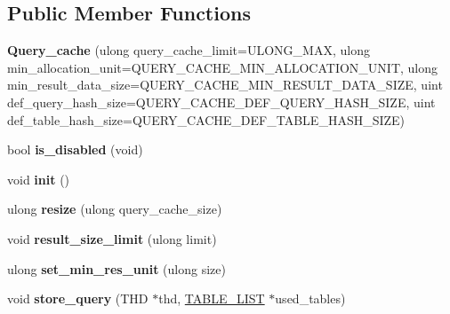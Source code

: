 \subsection*{Public Member Functions}
\begin{DoxyCompactItemize}
\item 
\mbox{\label{classQuery__cache_a5303b56588dbeffb235d08e13f2bbb4f}} 
{\bfseries Query\+\_\+cache} (ulong query\+\_\+cache\+\_\+limit=U\+L\+O\+N\+G\+\_\+\+M\+AX, ulong min\+\_\+allocation\+\_\+unit=Q\+U\+E\+R\+Y\+\_\+\+C\+A\+C\+H\+E\+\_\+\+M\+I\+N\+\_\+\+A\+L\+L\+O\+C\+A\+T\+I\+O\+N\+\_\+\+U\+N\+IT, ulong min\+\_\+result\+\_\+data\+\_\+size=Q\+U\+E\+R\+Y\+\_\+\+C\+A\+C\+H\+E\+\_\+\+M\+I\+N\+\_\+\+R\+E\+S\+U\+L\+T\+\_\+\+D\+A\+T\+A\+\_\+\+S\+I\+ZE, uint def\+\_\+query\+\_\+hash\+\_\+size=Q\+U\+E\+R\+Y\+\_\+\+C\+A\+C\+H\+E\+\_\+\+D\+E\+F\+\_\+\+Q\+U\+E\+R\+Y\+\_\+\+H\+A\+S\+H\+\_\+\+S\+I\+ZE, uint def\+\_\+table\+\_\+hash\+\_\+size=Q\+U\+E\+R\+Y\+\_\+\+C\+A\+C\+H\+E\+\_\+\+D\+E\+F\+\_\+\+T\+A\+B\+L\+E\+\_\+\+H\+A\+S\+H\+\_\+\+S\+I\+ZE)
\item 
\mbox{\label{classQuery__cache_a5367fca59aea9c2bc05dddc2548bec73}} 
bool {\bfseries is\+\_\+disabled} (void)
\item 
\mbox{\label{classQuery__cache_a9c175f78ac3992282c8b7951a909bd52}} 
void {\bfseries init} ()
\item 
\mbox{\label{classQuery__cache_a5f7784c30f875bdbeacd6d6e98c77317}} 
ulong {\bfseries resize} (ulong query\+\_\+cache\+\_\+size)
\item 
\mbox{\label{classQuery__cache_a241ffb7c0e78d3e1607baba672108131}} 
void {\bfseries result\+\_\+size\+\_\+limit} (ulong limit)
\item 
\mbox{\label{classQuery__cache_ac57ad22970fd96a2acadaaad1b8024a1}} 
ulong {\bfseries set\+\_\+min\+\_\+res\+\_\+unit} (ulong size)
\item 
\mbox{\label{classQuery__cache_a1f303c0b4f9f1173b1c14418664eff72}} 
void {\bfseries store\+\_\+query} (T\+HD $\ast$thd, \mbox{\hyperlink{structTABLE__LIST}{T\+A\+B\+L\+E\+\_\+\+L\+I\+ST}} $\ast$used\+\_\+tables)
\item 

\end{DoxyCompactItemize}
